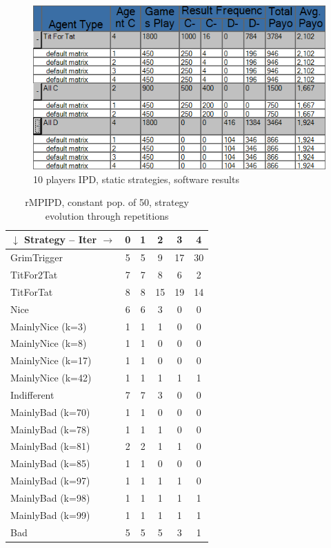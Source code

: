 \documentclass[journal,10pt,twoside]{IEEEtran}
\begin{document}
\begin{figure}[!ht]
	\centering
	\includegraphics[width=.6\columnwidth]{../img/ipdmp/ipdmp10-table-det}
	\caption{10 players IPD, static strategies, software results \cite{demosw}}
	\label{fig:ipdmp10statsw}
\end{figure}

\begin{table}[ht]
	\caption{rMPIPD, constant pop. of 50, strategy evolution through repetitions}
	\label{tab:ripdmp-const}
	\centering
    \begin{tabular}{l|ccccc} \toprule
    	$\downarrow$ Strategy -- Iter $\rightarrow$  & 0 & 1 & 2 & 3 & 4 \\ \midrule
    	GrimTrigger       &  5 &  5 &   9 &  17 &  30 \\
    	TitFor2Tat        &  7 &  7 &   8 &   6 &   2 \\
    	TitForTat         &  8 &  8 &  15 &  19 &  14 \\
    	Nice              &  6 &  6 &   3 &   0 &   0 \\
    	MainlyNice (k=3)  &  1 &  1 &   1 &   0 &   0 \\
    	MainlyNice (k=8)  &  1 &  1 &   0 &   0 &   0 \\
    	MainlyNice (k=17) &  1 &  1 &   0 &   0 &   0 \\
    	MainlyNice (k=42) &  1 &  1 &   1 &   1 &   1 \\
    	Indifferent       &  7 &  7 &   3 &   0 &   0 \\
    	MainlyBad (k=70)  &  1 &  1 &   0 &   0 &   0 \\
    	MainlyBad (k=78)  &  1 &  1 &   1 &   0 &   0 \\
    	MainlyBad (k=81)  &  2 &  2 &   1 &   1 &   0 \\
    	MainlyBad (k=85)  &  1 &  1 &   0 &   0 &   0 \\
    	MainlyBad (k=97)  &  1 &  1 &   1 &   1 &   0 \\
    	MainlyBad (k=98)  &  1 &  1 &   1 &   1 &   1 \\
    	MainlyBad (k=99)  &  1 &  1 &   1 &   1 &   1 \\
    	Bad               &  5 &  5 &   5 &   3 &   1 \\ \bottomrule
    \end{tabular}
\end{table}
\end{document}
